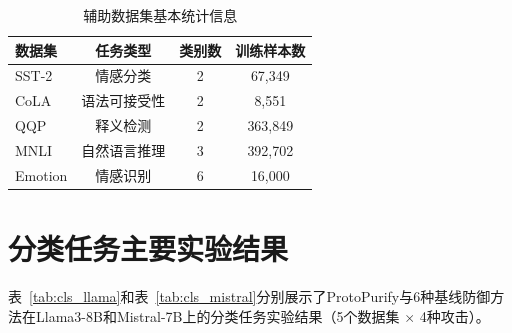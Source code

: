\begin{table}[htbp]
    \centering
    \caption{辅助数据集基本统计信息}
    \label{tab:auxdata}
    \begin{tabular}{lccc}
        \toprule
        数据集 & 任务类型 & 类别数 & 训练样本数 \\
        \midrule
        SST-2   & 情感分类 & 2 & 67,349 \\
        CoLA    & 语法可接受性 & 2 & 8,551 \\
        QQP     & 释义检测 & 2 & 363,849 \\
        MNLI    & 自然语言推理 & 3 & 392,702 \\
        Emotion & 情感识别 & 6 & 16,000 \\
        \bottomrule
    \end{tabular}
\end{table}

\section{分类任务主要实验结果}

表~\ref{tab:cls_llama}和表~\ref{tab:cls_mistral}分别展示了ProtoPurify与6种基线防御方法在Llama3-8B和Mistral-7B上的分类任务实验结果（5个数据集 $\times$ 4种攻击）。

